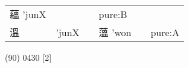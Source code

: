 \documentclass[14pt,a4paper]{scrartcl}
\begin{document}
\begin{longtable}[c]{@{}llllll@{}}
\begin{minipage}[t]{0.14\columnwidth}
蘊 'junX
\strut\end{minipage} &
\begin{minipage}[t]{0.14\columnwidth}\raggedright\strut
\strut\end{minipage} &
\begin{minipage}[t]{0.14\columnwidth}\raggedright\strut
\strut\end{minipage} &
\begin{minipage}[t]{0.14\columnwidth}\raggedright\strut
pure:B
\strut\end{minipage}\tabularnewline
\begin{minipage}[t]{0.14\columnwidth}\raggedright\strut
溫
\strut\end{minipage} &
\begin{minipage}[t]{0.14\columnwidth}\raggedright\strut
'junX
\strut\end{minipage} &
\begin{minipage}[t]{0.14\columnwidth}\raggedright\strut
\strut\end{minipage} &
\begin{minipage}[t]{0.14\columnwidth}\raggedright\strut
薀 'won
\strut\end{minipage} &
\begin{minipage}[t]{0.14\columnwidth}\raggedright\strut
\strut\end{minipage} &
\begin{minipage}[t]{0.14\columnwidth}\raggedright\strut
pure:A
\strut\end{minipage}\tabularnewline
\bottomrule
\end{longtable}

(90) 0430 {[}2{]}
\end{document}
